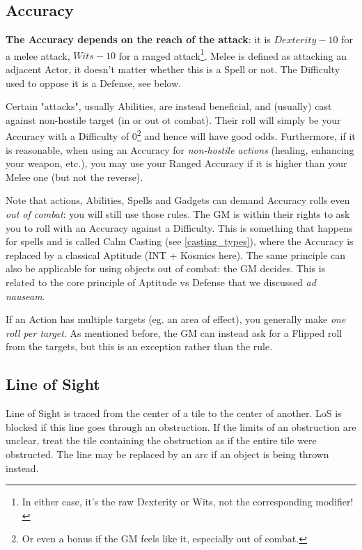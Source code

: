 \subsection{Accuracy}

\label{accuracies}

\textbf{The Accuracy depends on the reach of the attack}: it is $Dexterity - 10$ for a melee attack, $Wits-10$ for a ranged attack\footnote{In either case, it's the raw Dexterity or Wits, not the corresponding modifier!}. Melee is defined as attacking an adjacent Actor, it doesn't matter whether this is a Spell or not. The Difficulty used to oppose it is a Defense, see below.

Certain "attacks", usually Abilities, are instead beneficial, and (usually) cast against non-hostile target (in or out ot combat). Their roll will simply be your Accuracy with a Difficulty of 0\footnote{Or even a bonus if the GM feels like it, especially out of combat.} and hence will have good odds. Furthermore, if it is reasonable, when using an Accuracy for \textit{non-hostile actions} (healing, enhancing your weapon, etc.), you may use your Ranged Accuracy if it is higher than your Melee one (but not the reverse).

Note that actions, Abilities, Spells and Gadgets can demand Accuracy rolls even \textit{out of combat}: you will still use those rules. The GM is within their rights to ask you to roll with an Accuracy against a Difficulty. This is something that happens for spells and is called Calm Casting (see \ref{casting_types}), where the Accuracy is replaced by a classical Aptitude (INT + Kosmics here). The same principle can also be applicable for using objects out of combat: the GM decides. This is related to the core principle of Aptitude vs Defense that we discussed \textit{ad nauseam}.

If an Action has multiple targets (eg. an area of effect), you generally make \textit{one roll per target}. As mentioned before, the GM can instead ask for a Flipped roll from the targets, but this is an exception rather than the rule. 


\subsection{Line of Sight}

Line of Sight is traced from the center of a tile to the center of another. LoS is blocked if this line goes through an obstruction. If the limits of an obstruction are unclear, treat the tile containing the obstruction as if the entire tile were obstructed. The line may be replaced by an arc if an object is being thrown instead. 

